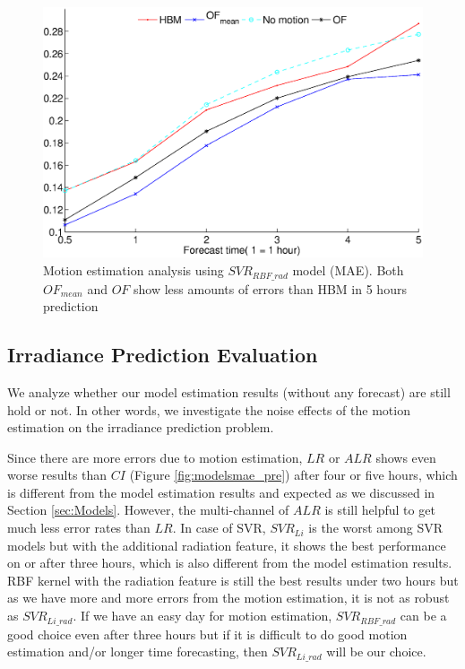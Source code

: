 \documentclass[conference]{IEEEtran}
\begin{document}


\begin{figure}[tb]
\centering
\includegraphics[width=3 in]{pics/SVRRBF_rad}
\caption{Motion estimation analysis using $SVR_{RBF\_rad}$ model (MAE). Both $OF_{mean}$
and $OF$ show less amounts of errors than HBM in 5 hours prediction}
\label{fig:mesvrrbfrad}
\end{figure}



\subsection{Irradiance Prediction Evaluation}
\label{subsec:forecast_e}
We analyze whether our model estimation results (without any forecast) are still hold or not. 
In other words, we investigate the noise effects of the motion estimation
on the irradiance prediction problem.
 
Since there are more errors due to motion estimation, $LR$ or $ALR$ shows even worse 
results than $CI$ (Figure \ref{fig:modelsmae_pre}) after four or five hours,
which is different from the model estimation results and expected as we discussed in Section \ref{sec:Models}.
However, the multi-channel of $ALR$ is still helpful to get much less error rates than $LR$.
In case of SVR, $SVR_{Li}$ is the worst among SVR models but with the additional radiation feature, 
it shows the best performance on or after three hours, which is also different from the model estimation results.
RBF kernel with the radiation feature is still the best results under two hours but as we have more and more errors 
from the motion estimation, it is not as robust as $SVR_{Li\_rad}$.
If we have an easy day for motion estimation, $SVR_{RBF\_rad}$ can be a good choice even after three hours
but if it is difficult to do good motion estimation and/or longer time forecasting, then $SVR_{Li\_rad}$ will be our choice.
\end{document}
